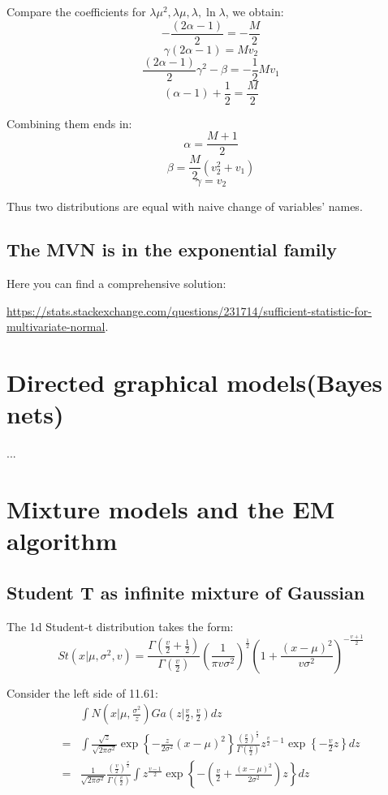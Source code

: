 \documentclass[UTF8]{ctexart}
\begin{document}
Compare the coefficients for $\lambda \mu^{2},\lambda \mu,\lambda,\ln \lambda$, we obtain:
$$-\frac{(2\alpha-1)}{2} = -\frac{M}{2}$$
$$\gamma(2\alpha-1)=Mv_{2}$$
$$\frac{(2\alpha-1)}{2}\gamma^{2}-\beta=-\frac{1}{2}Mv_{1}$$
$$(\alpha-1)+\frac{1}{2}=\frac{M}{2}$$

Combining them ends in:
$$\alpha = \frac{M+1}{2}$$
$$\beta = \frac{M}{2}(v_{2}^{2}+v_{1})$$
$$\gamma = v_{2}$$

Thus two distributions are equal with naive change of variables' names.

\subsection{The MVN is in the exponential family}
Here you can find a comprehensive solution:

\url{https://stats.stackexchange.com/questions/231714/sufficient-statistic-for-multivariate-normal}.

\newpage
\section{Directed graphical models(Bayes nets)}
...

\newpage
\section{Mixture models and the EM algorithm}
\subsection{Student T as infinite mixture of Gaussian}
The 1d Student-t distribution takes the form:
$$St(x|\mu,\sigma^{2},v)=\frac{\Gamma(\frac{v}{2}+\frac{1}{2})}{\Gamma(\frac{v}{2})}(\frac{1}{\pi v \sigma^{2}})^{\frac{1}{2}}(1+\frac{(x-\mu)^{2}}{v\sigma^{2}})^{-\frac{v+1}{2}}$$

Consider the left side of 11.61:
\begin{align}
 & \int N(x|\mu,\frac{\sigma^{2}}{z})Ga(z|\frac{v}{2},\frac{v}{2})dz \nonumber \\
=&\int \frac{\sqrt{z}}{\sqrt{2\pi\sigma^{2}}}\exp\left\{ -\frac{z}{2\sigma^{2}}(x-\mu)^{2} \right\}\frac{(\frac{v}{2})^{\frac{v}{2}}}{\Gamma(\frac{v}{2})}z^{\frac{v}{2}-1}\exp\left\{ -\frac{v}{2}z \right\}dz \nonumber \\
=&\frac{1}{\sqrt{2\pi \sigma^{2}}}\frac{(\frac{v}{2})^{\frac{v}{2}}}{\Gamma(\frac{v}{2})}\int z^{\frac{v-1}{2}}\exp\left\{ -(\frac{v}{2}+\frac{(x-\mu)^{2}}{2\sigma^{2}})z \right\} dz \nonumber
\end{align}
\end{document}
